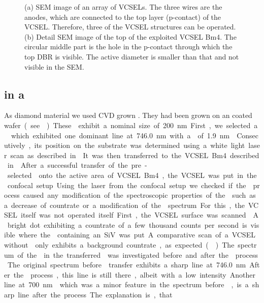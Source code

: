 \begin{figure}[tp]
\begin{subfigure}[t]{ 0.49\linewidth}
{}			\caption{}
			\label{subfig::vcsel_sem_detail}
		\end{subfigure}
		\caption{(a) SEM image of an array of VCSELs. The three wires are the anodes, which are connected to the top layer (p-contact) of the VCSEL. Therefore, three of the VCSEL structures can be operated. (b) Detail SEM image of the top of the exploited VCSEL Bm4. The circular middle part is the hole in the p-contact through which the top DBR is visible. The active diameter is smaller than that and not visible in the SEM.}
	\end{figure}

	\subsection{\siv in a \Vcsel}

	As diamond material we used CVD grown \nds.
	They had been grown on an \ir coated \si wafer (see ).
	These \nds exhibit a nominal size of \SI{200}{nm}.
	First, we selected a \nd which exhibited one dominant line at \SI{746.0}{nm} with a \lw of \SI{1.9}{nm}.
	Consecutively, its position on the substrate was determined using a white light laser scan as described in .
	It was then transferred to the VCSEL Bm4 described in .
	
	After a successful transfer of the pre-selected \nd onto the active area of VCSEL Bm4, the VCSEL was put in the confocal setup.
	Using the laser from the confocal setup we checked if the \pp process caused any modification of the spectroscopic properties of the \siv such as a decrease of countrate or a modification of the \fl spectrum.
	For this, the VCSEL itself was not operated itself.
	First, the VCSEL surface was scanned .
	.
	A bright dot exhibiting a countrate of a few thousand counts per second is visible where the \nd containing an SiV was put.
	A comparative scan of a VCSEL without \nd only exhibits a background countrate, as expected ().
	
	The spectrum of the \siv in the transferred \nd was investigated before and after the \pp process.
	The original spectrum before \nd transfer exhibits a sharp line at \SI{746.0}{nm}.
	After the \pp process, this line is still there, albeit with a low intensity.
	Another line at \SI{700}{nm}  which was a minor feature in the spectrum before \pp, is a sharp line after the process. 
	The explanation is, that 



